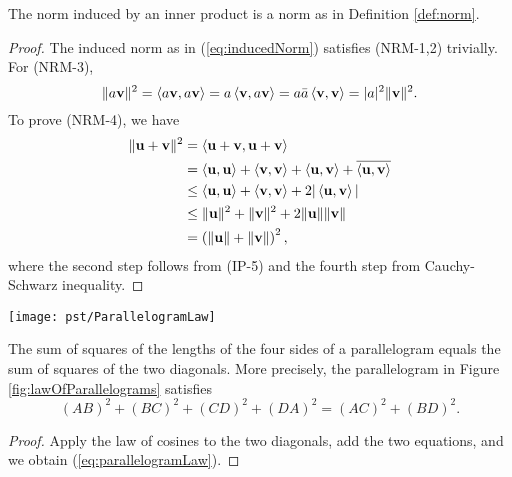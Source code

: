 \begin{lem}
  \label{lem:inducedNormIsNorm}
  The norm induced by an inner product
  is a norm as in Definition \ref{def:norm}.
\end{lem}
\begin{proof}
  The induced norm as in (\ref{eq:inducedNorm})
  satisfies (NRM-1,2) trivially. For (NRM-3),
  \begin{equation*}
    \|a\mathbf{v}\|^2 = \left\langle a\mathbf{v}, a\mathbf{v} \right\rangle
    = a\left\langle \mathbf{v}, a\mathbf{v} \right\rangle
    = a\bar{a}\left\langle \mathbf{v},\mathbf{v} \right\rangle
    = |a|^2 \|\mathbf{v}\|^2.
  \end{equation*}
  To prove (NRM-4), we have
  \begin{align*}
    \|\mathbf{u}+\mathbf{v}\|^2 &=
                                  \left\langle \mathbf{u}+\mathbf{v}, \mathbf{u}+\mathbf{v} \right\rangle
    \\ &=
         \left\langle \mathbf{u}, \mathbf{u} \right\rangle+ \left\langle \mathbf{v},\mathbf{v} \right\rangle
         + \left\langle \mathbf{u}, \mathbf{v} \right\rangle+ \overline{\left\langle \mathbf{u},\mathbf{v} \right\rangle}
    \\ &\le
         \left\langle \mathbf{u}, \mathbf{u} \right\rangle+ \left\langle \mathbf{v},\mathbf{v} \right\rangle
         + 2|\left\langle \mathbf{u}, \mathbf{v} \right\rangle|
    \\ &\le
         \|\mathbf{u}\|^2+\|\mathbf{v}\|^2+2\|\mathbf{u}\|\|\mathbf{v}\|
    \\ &=
         \left(\|\mathbf{u}\|+\|\mathbf{v}\|\right)^2,
  \end{align*}
  where the second step follows from (IP-5)
  and the fourth step from
  Cauchy-Schwarz inequality.
\end{proof}

\begin{Figure}
  \centering
  \texttt{[image: pst/ParallelogramLaw]}
  \label{fig:lawOfParallelograms}
\end{Figure}

\begin{thm}
  \label{thm:parallelogramLaw}
  The sum of squares of the lengths of the four sides
  of a parallelogram equals
  the sum of squares of the two diagonals.
  More precisely,
  the parallelogram in Figure \ref{fig:lawOfParallelograms}
  satisfies 
  \begin{equation}
    \label{eq:parallelogramLaw}
    (AB)^2 + (BC)^2 + (CD)^2 + (DA)^2 = (AC)^2 + (BD)^2.
  \end{equation}
\end{thm}
\begin{proof}
  Apply the law of cosines to the two diagonals,
  add the two equations, and we obtain (\ref{eq:parallelogramLaw}).
\end{proof}

